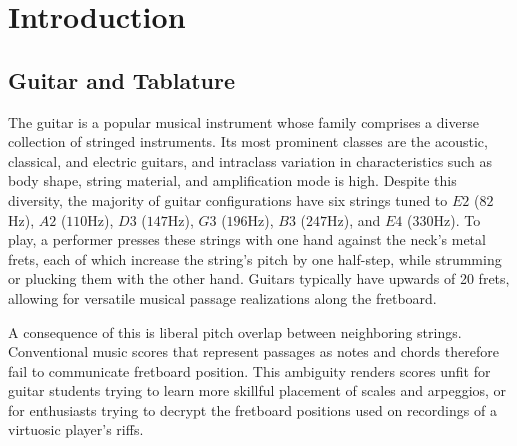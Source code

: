 \documentclass[12pt]{cmuthesis}
\begin{document}



\tableofcontents

\mainmatter


%
%
%
%
%
\noindent
\chapter{Introduction} 
\section{Guitar and Tablature} The guitar is a popular musical instrument whose family comprises a diverse collection of stringed instruments. Its most prominent classes are the acoustic, classical, and electric guitars, and intraclass variation in characteristics such as body shape, string material, and amplification mode is high. Despite this diversity, the majority of guitar configurations have six strings tuned to $E2$ ($82$Hz), $A2$ ($110$Hz), $D3$ ($147$Hz), $G3$ ($196$Hz), $B3$ ($247$Hz), and $E4$ ($330$Hz). To play, a performer presses these strings with one hand against the neck's metal frets, each of which increase the string's pitch by one half-step, while strumming or plucking them with the other hand. Guitars typically have upwards of 20 frets, allowing for versatile musical passage realizations along the fretboard.

A consequence of this is liberal pitch overlap between neighboring strings. Conventional music scores that represent passages as notes and chords therefore fail to communicate fretboard position. This ambiguity renders scores unfit for guitar students trying to learn more skillful placement of scales and arpeggios, or for enthusiasts trying to decrypt the fretboard positions used on recordings of a virtuosic player's riffs.
\end{document}
